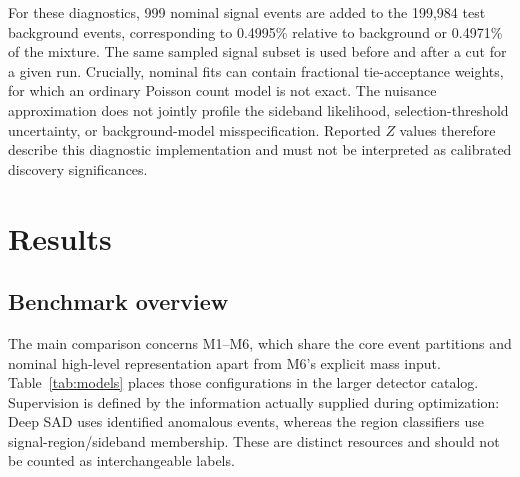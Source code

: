 \documentclass[reprint,aps,pra,amsmath,amssymb,floatfix,raggedbottom]{revtex4-2}
\begin{document}
For these diagnostics, 999 nominal signal events are added to the 199,984 test background events, corresponding to 0.4995\% relative to background or 0.4971\% of the mixture. The same sampled signal subset is used before and after a cut for a given run. Crucially, nominal fits can contain fractional tie-acceptance weights, for which an ordinary Poisson count model is not exact. The nuisance approximation does not jointly profile the sideband likelihood, selection-threshold uncertainty, or background-model misspecification. Reported $Z$ values therefore describe this diagnostic implementation and must not be interpreted as calibrated discovery significances.

\section{Results}
\subsection{Benchmark overview}
The main comparison concerns M1--M6, which share the core event partitions and nominal high-level representation apart from M6's explicit mass input. Table~\ref{tab:models} places those configurations in the larger detector catalog. Supervision is defined by the information actually supplied during optimization: Deep SAD uses identified anomalous events, whereas the region classifiers use signal-region/sideband membership. These are distinct resources and should not be counted as interchangeable labels.
\end{document}
